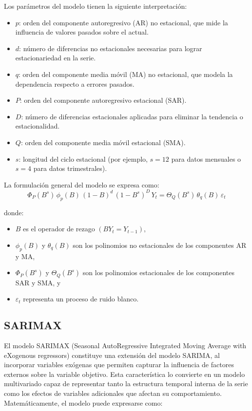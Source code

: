 \justify
Los parámetros del modelo tienen la siguiente interpretación:

\begin{itemize}
\item $p$: orden del componente autoregresivo (AR) no estacional, que mide la influencia de valores pasados sobre el actual.
\item $d$: número de diferencias no estacionales necesarias para lograr estacionariedad en la serie.
\item $q$: orden del componente media móvil (MA) no estacional, que modela la dependencia respecto a errores pasados.
\item $P$: orden del componente autoregresivo estacional (SAR).
\item $D$: número de diferencias estacionales aplicadas para eliminar la tendencia o estacionalidad.
\item $Q$: orden del componente media móvil estacional (SMA).
\item $s$: longitud del ciclo estacional (por ejemplo, $s = 12$ para datos mensuales o $s = 4$ para datos trimestrales).

\end{itemize}

\justify
La formulación general del modelo se expresa como:
\begin{equation}
 \Phi_P(B^s)\,\phi_p(B)\,(1 - B)^d\,(1 - B^s)^D\,Y_t
 = \Theta_Q(B^s)\,\theta_q(B)\,\varepsilon_t
\end{equation}

\justify
donde:
\begin{itemize}
\item  $B$ es el operador de rezago $(B Y_t = Y_{t-1})$,

\item  $\phi_p(B)$ y $\theta_q(B)$ son los polinomios no estacionales de los componentes AR y MA,

\item  $\Phi_P(B^s)$ y $\Theta_Q(B^s)$ son los polinomios estacionales de los componentes SAR y SMA, y

\item  $\varepsilon_t$ representa un proceso de ruido blanco.
\end{itemize}

\subsection{SARIMAX}
\justify
El modelo SARIMAX (Seasonal AutoRegressive Integrated Moving Average with eXogenous regressors) constituye una extensión del modelo SARIMA, al incorporar variables exógenas que permiten capturar la influencia de factores externos sobre la variable objetivo. Esta característica lo convierte en un modelo multivariado capaz de representar tanto la estructura temporal interna de la serie como los efectos de variables adicionales que afectan su comportamiento. 
Matemáticamente, el modelo puede expresarse como:


